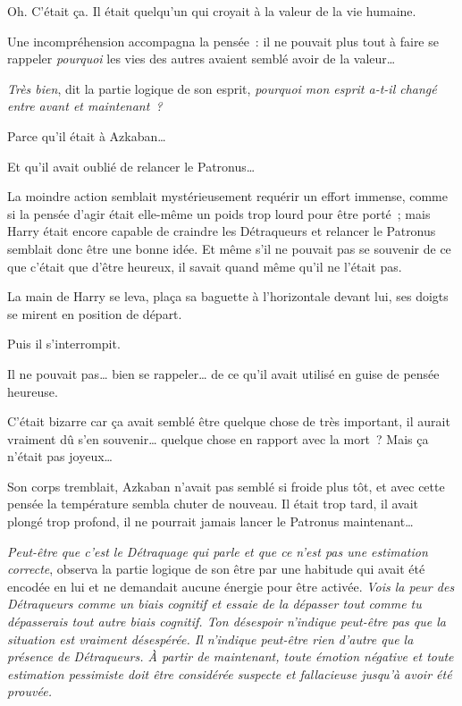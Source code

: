 Oh. C'était ça.
Il était quelqu'un qui croyait à la valeur de la vie humaine.

 Une incompréhension accompagna la pensée~: il ne pouvait plus tout à faire se rappeler \emph{pourquoi} les vies des autres avaient semblé avoir de la valeur…

\emph{Très bien}, dit la partie logique de son esprit, \emph{pourquoi mon esprit a-t-il changé entre avant et maintenant~?}

Parce qu'il était à Azkaban…

Et qu'il avait oublié de relancer le Patronus…

La moindre action semblait mystérieusement requérir un effort immense, comme si la pensée d'agir était elle-même un poids trop lourd pour être porté~; mais Harry était encore capable de craindre les Détraqueurs et relancer le Patronus semblait donc être une bonne idée.
Et même s'il ne pouvait pas se souvenir de ce que c'était que d'être heureux, il savait quand même qu'il ne l'était pas.

La main de Harry se leva, plaça sa baguette à l'horizontale devant lui, ses doigts se mirent en position de départ.

Puis il s'interrompit.

Il ne pouvait pas… bien se rappeler… de ce qu'il avait utilisé en guise de pensée heureuse.

C'était bizarre car ça avait semblé être quelque chose de très important, il aurait vraiment dû s'en souvenir… quelque chose en rapport avec la mort~?
Mais ça n'était pas joyeux…

Son corps tremblait, Azkaban n'avait pas semblé si froide plus tôt, et avec cette pensée la température sembla chuter de nouveau.
Il était trop tard, il avait plongé trop profond, il ne pourrait jamais lancer le Patronus maintenant…

\emph{Peut-être que c'est le Détraquage qui parle et que ce n'est pas une estimation correcte}, observa la partie logique de son être par une habitude qui avait été encodée en lui et ne demandait aucune énergie pour être activée.
\emph{Vois la peur des Détraqueurs comme un biais cognitif et essaie de la dépasser tout comme tu dépasserais tout autre biais cognitif.
Ton désespoir n'indique peut-être pas que la situation est vraiment désespérée.
Il n'indique peut-être rien d'autre que la présence de Détraqueurs.
À partir de maintenant, toute émotion négative et toute estimation pessimiste doit être considérée suspecte et fallacieuse jusqu'à avoir été prouvée.}

